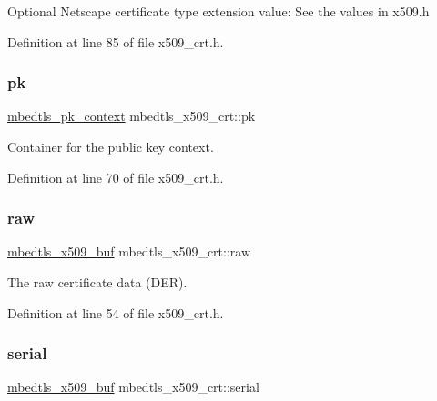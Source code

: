 Optional Netscape certificate type extension value\+: See the values in x509.\+h 

Definition at line 85 of file x509\+\_\+crt.\+h.

\mbox{\label{structmbedtls__x509__crt_a64f66291338e6b230542d83035fe5f20}} 
\subsubsection{\texorpdfstring{pk}{pk}}
{\footnotesize\ttfamily \mbox{\hyperlink{structmbedtls__pk__context}{mbedtls\+\_\+pk\+\_\+context}} mbedtls\+\_\+x509\+\_\+crt\+::pk}

Container for the public key context. 

Definition at line 70 of file x509\+\_\+crt.\+h.

\mbox{\label{structmbedtls__x509__crt_a5bfef6b8b81bc081f796cb1f6bb28839}} 
\subsubsection{\texorpdfstring{raw}{raw}}
{\footnotesize\ttfamily \mbox{\hyperlink{group__x509__module_ga4d02c9e8e4e2934555e0d132cd2976dc}{mbedtls\+\_\+x509\+\_\+buf}} mbedtls\+\_\+x509\+\_\+crt\+::raw}

The raw certificate data (D\+ER). 

Definition at line 54 of file x509\+\_\+crt.\+h.

\mbox{\label{structmbedtls__x509__crt_a5c3ae8b4aba6e1c40cb1f6a85da36116}} 
\subsubsection{\texorpdfstring{serial}{serial}}
{\footnotesize\ttfamily \mbox{\hyperlink{group__x509__module_ga4d02c9e8e4e2934555e0d132cd2976dc}{mbedtls\+\_\+x509\+\_\+buf}} mbedtls\+\_\+x509\+\_\+crt\+::serial}


